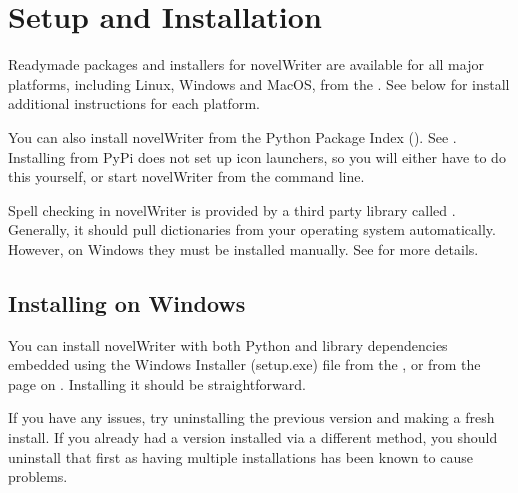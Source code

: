 \documentclass[a4paper,11pt,english]{sphinxmanual}
\begin{document}
\sphinxstepscope


\chapter{Setup and Installation}
\label{\detokenize{int_started:setup-and-installation}}\label{\detokenize{int_started:a-started}}\label{\detokenize{int_started::doc}}
\sphinxAtStartPar
Ready\sphinxhyphen{}made packages and installers for novelWriter are available for all major platforms, including
Linux, Windows and MacOS, from the . See below for install additional instructions
for each platform.

\sphinxAtStartPar
You can also install novelWriter from the Python Package Index (). See {\hyperref[\detokenize{int_started:a-started-pip}]{}}.
Installing from PyPi does not set up icon launchers, so you will either have to do this yourself,
or start novelWriter from the command line.

\sphinxAtStartPar
Spell checking in novelWriter is provided by a third party library called . Generally, it
should pull dictionaries from your operating system automatically. However, on Windows they must be
installed manually. See {\hyperref[\detokenize{more_customise:a-custom-dict}]{}} for more details.


\section{Installing on Windows}
\label{\detokenize{int_started:installing-on-windows}}\label{\detokenize{int_started:a-started-windows}}
\sphinxAtStartPar
You can install novelWriter with both Python and library dependencies embedded using the Windows
Installer (setup.exe) file from the , or from the  page on .
Installing it should be straightforward.

\sphinxAtStartPar
If you have any issues, try uninstalling the previous version and making a fresh install. If you
already had a version installed via a different method, you should uninstall that first as having
multiple installations has been known to cause problems.
\end{document}

